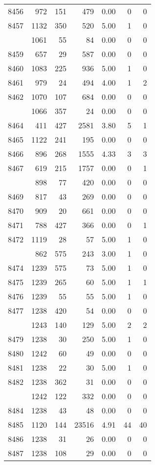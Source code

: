 \documentclass[
]{article}
\begin{document}
\begin{table}
\begin{tabular}[t]{lrrrrrr}
8456 & 972 & 151 & 479 & 0.00 & 0 & 0\\
8457 & 1132 & 350 & 520 & 5.00 & 1 & 0\\
\addlinespace
8458 & 1061 & 55 & 84 & 0.00 & 0 & 0\\
8459 & 657 & 29 & 587 & 0.00 & 0 & 0\\
8460 & 1083 & 225 & 936 & 5.00 & 1 & 0\\
8461 & 979 & 24 & 494 & 4.00 & 1 & 2\\
8462 & 1070 & 107 & 684 & 0.00 & 0 & 0\\
\addlinespace
8463 & 1066 & 357 & 24 & 0.00 & 0 & 0\\
8464 & 411 & 427 & 2581 & 3.80 & 5 & 1\\
8465 & 1122 & 241 & 195 & 0.00 & 0 & 0\\
8466 & 896 & 268 & 1555 & 4.33 & 3 & 3\\
8467 & 619 & 215 & 1757 & 0.00 & 0 & 1\\
\addlinespace
8468 & 898 & 77 & 420 & 0.00 & 0 & 0\\
8469 & 817 & 43 & 269 & 0.00 & 0 & 0\\
8470 & 909 & 20 & 661 & 0.00 & 0 & 0\\
8471 & 788 & 427 & 366 & 0.00 & 0 & 1\\
8472 & 1119 & 28 & 57 & 5.00 & 1 & 0\\
\addlinespace
8473 & 862 & 575 & 243 & 3.00 & 1 & 0\\
8474 & 1239 & 575 & 73 & 5.00 & 1 & 0\\
8475 & 1239 & 265 & 60 & 5.00 & 1 & 1\\
8476 & 1239 & 55 & 55 & 5.00 & 1 & 0\\
8477 & 1238 & 420 & 54 & 0.00 & 0 & 0\\
\addlinespace
8478 & 1243 & 140 & 129 & 5.00 & 2 & 2\\
8479 & 1238 & 30 & 250 & 5.00 & 1 & 0\\
8480 & 1242 & 60 & 49 & 0.00 & 0 & 0\\
8481 & 1238 & 22 & 30 & 5.00 & 1 & 0\\
8482 & 1238 & 362 & 31 & 0.00 & 0 & 0\\
\addlinespace
8483 & 1242 & 122 & 332 & 0.00 & 0 & 0\\
8484 & 1238 & 43 & 48 & 0.00 & 0 & 0\\
8485 & 1120 & 144 & 23516 & 4.91 & 44 & 40\\
8486 & 1238 & 31 & 26 & 0.00 & 0 & 0\\
8487 & 1238 & 108 & 29 & 0.00 & 0 & 0\\

\end{tabular}
\end{table}
\end{document}
